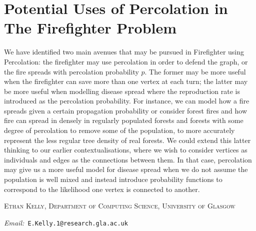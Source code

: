 \documentclass[11pt]{amsart}
\makeatletter
\newcommand{\Addresses}{{%
  \bigskip
  \footnotesize
  \textsc{Ethan Kelly, Department of Computing Science, University of Glasgow}\par\nopagebreak
   \textit{Email:~}\texttt{E.Kelly.1@research.gla.ac.uk}

}}
\makeatother
\begin{document}
\section{Potential Uses of Percolation in The Firefighter Problem}

We have identified two main avenues that may be pursued in Firefighter using Percolation: the firefighter may use percolation in order to defend the graph, or the fire spreads with percolation probability $p$. The former may be more useful when the firefighter can save more than one vertex at each turn; the latter may be more useful when modelling disease spread where the reproduction rate is introduced as the percolation probability. For instance, we can model how a fire spreads given a certain propagation probability or consider forest fires and how fire can spread in densely in regularly populated forests and forests with some degree of percolation to remove some of the population, to more accurately represent the less regular tree density of real forests. We could extend this latter thinking to our earlier contextualisations, where we wish to consider vertices as individuals and edges as the connections between them. In that case, percolation may give us a more useful model for disease spread when we do not assume the population is well mixed and instead introduce probability functions to correspond to the likelihood one vertex is connected to another.







\Addresses
\end{document}
